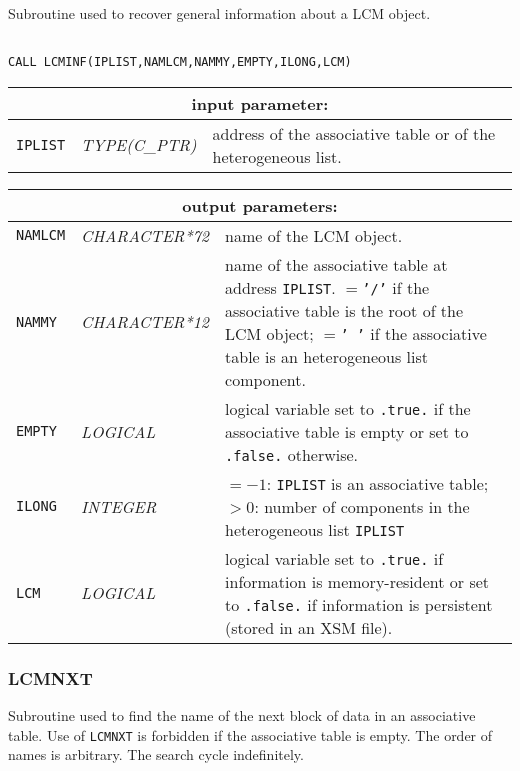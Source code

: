 Subroutine used to recover general information about a LCM object.

\begin{verbatim}

CALL LCMINF(IPLIST,NAMLCM,NAMMY,EMPTY,ILONG,LCM)
\end{verbatim}

\noindent
\begin{tabular}{|p{1.5cm}|p{3cm}|p{10cm}|}
\hline
\multicolumn{3}{|c|}{\bf input parameter:} \\
\hline
{\tt IPLIST} & {\it TYPE(C\_PTR)} & address of the associative table or of the heterogeneous list. \\
\hline
\end{tabular}

\vskip 0.8cm

\noindent
\begin{tabular}{|p{1.5cm}|p{3cm}|p{10cm}|}
\hline
\multicolumn{3}{|c|}{\bf output parameters:} \\
\hline
{\tt NAMLCM} & {\it CHARACTER*72} & name of the LCM object. \\
\hline
{\tt NAMMY} & {\it CHARACTER*12} & name of the associative table at address {\tt IPLIST}. $=${\tt '/'} if the associative table
is the root of the LCM object; $=${\tt ' '} if the associative table
is an heterogeneous list component. 
\\
\hline
{\tt EMPTY} & {\it LOGICAL} & logical variable set to {\tt .true.} 
                            if the associative table is empty
			    or set to {\tt .false.} otherwise. \\
\hline
{\tt ILONG} & {\it INTEGER} & $=-1$: {\tt IPLIST} is an associative table; $>0$: number of components in the heterogeneous list  {\tt IPLIST}\\
\hline
{\tt LCM} & {\it LOGICAL} & logical variable set to {\tt .true.} 
                                  if information is memory-resident or set to {\tt .false.} if information is persistent (stored in an XSM file). \\
\hline
\end{tabular}

\subsubsection{LCMNXT}

Subroutine used to find the name of the next block of data in an associative table. Use
of {\tt LCMNXT} is forbidden if the associative table is empty. The order of names is
arbitrary. The search cycle indefinitely.

